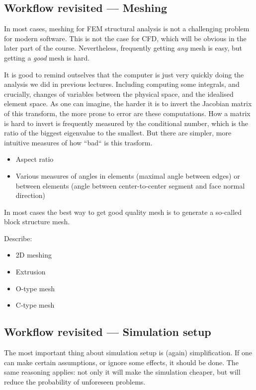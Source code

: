\documentclass{article}
\begin{document}
\subsection{Workflow revisited --- Meshing}
In most cases, meshing for FEM structural analysis is not a challenging problem for modern software. This is not the case for CFD, which will be obvious in the later part of the course. Nevertheless, frequently getting {\it any} mesh is easy, but getting a {\it good} mesh is hard.

It is good to remind outselves that the computer is just very quickly doing the analysis we did in previous lectures. Including computing some integrals, and crucially, changes of variables between the physical space, and the idealised element space. As one can imagine, the harder it is to invert the Jacobian matrix of this transform, the more prone to error are these computations. How a matrix is hard to invert is frequently measured by the conditional number, which is the ratio of the biggest eigenvalue to the smallest. But there are simpler, more intuitive measures of how ``bad`` is this trasform.
\begin{itemize}
    \item Aspect ratio
    \item Various measures of angles in elements (maximal angle between edges) or between elements (angle between center-to-center segment and face normal direction)
\end{itemize}
In most cases the best way to get good quality mesh is to generate a so-called block structure mesh.

Describe:
\begin{itemize}
    \item 2D meshing
    \item Extrusion
    \item O-type mesh
    \item C-type mesh
\end{itemize}

\subsection{Workflow revisited --- Simulation setup}
The most important thing about simulation setup is (again) simplification. If one can make certain assumptions, or ignore some effects, it should be done. The same reasoning applies: not only it will make the simulation cheaper, but will reduce the probability of unforeseen problems.
\end{document}
